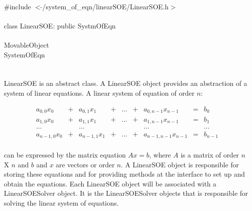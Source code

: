 
   \\
\indent \#include $<\tilde{ }$/system\_of\_eqn/linearSOE/LinearSOE.h$>$  \\

  \\
\indent class LinearSOE: public SystmOfEqn \\

 \\
\indent MovableObject \\
\indent\indent SystemOfEqn \\
\indent\indent{} \\

  \\
\indent LinearSOE is an abstract class. A LinearSOE object provides an
abstraction of a system of linear equations. A linear system of
equation of order $n$:

$$ 
\begin{array}{ccccccccc}
a_{0,0}x_0 & + & a_{0,1}x_1  & + & ... & + & a_{0,n-1}x_{n-1} & = & b_0  \\
a_{1,0}x_0 & + & a_{1,1}x_1  & + & ... & + & a_{1,n-1}x_{n-1} & = & b_1 \\
 ...  &  & ...  &  & & &  ... & & ... \\
a_{n-1,0}x_0 & + & a_{n-1,1}x_1  & + & ... & + & a_{n-1,n-1}x_{n-1} &
= & b_{n-1} \\ 
\end{array}
$$

\noindent can be expressed by the matrix equation $Ax=b$, where $A$ is a matrix
of order $n$ X $n$ and $b$ and $x$ are vectors or order $n$. A
LinearSOE object is responsible for storing these equations and for
providing methods at the interface to set up and obtain the
equations. Each LinearSOE object will be associated with a
LinearSOESolver object. It is the LinearSOESolver objects that is
responsible for solving the linear system of equations. \\


 \\
\indent{}  \\ 
\indent{}  \\ \\
\indent{}  \\ 
\indent{}\\ \\
\indent{}  \\ 
\indent{} \\
\indent{} \\
\indent{} \\

